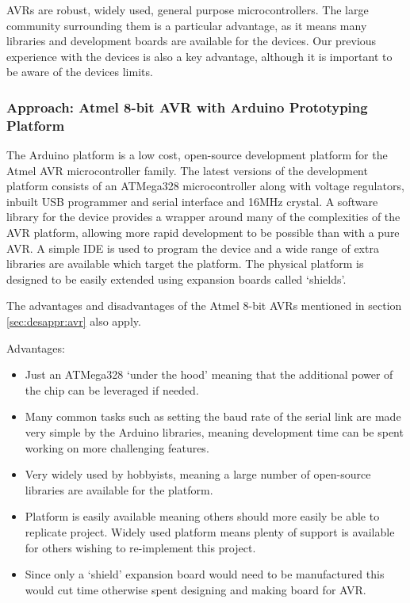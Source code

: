 AVRs are robust, widely used, general purpose microcontrollers. The large community surrounding them is a particular advantage, as it means many libraries and development boards are available for the devices. Our previous experience with the devices is also a key advantage, although it is important to be aware of the devices limits.


\subsubsection{Approach: Atmel 8-bit AVR with Arduino Prototyping Platform}

The Arduino platform is a low cost, open-source development platform for the Atmel AVR microcontroller family. The latest versions of the development platform consists of an ATMega328 microcontroller along with voltage regulators, inbuilt USB programmer and serial interface and 16MHz crystal. A software library for the device provides a wrapper around many of the complexities of the AVR platform, allowing more rapid development to be possible than with a pure AVR. A simple IDE is used to program the device and a wide range of extra libraries are available which target the platform. The physical platform is designed to be easily extended using expansion boards called `shields'.

The advantages and disadvantages of the Atmel 8-bit AVRs mentioned in section \ref{sec:desappr:avr} also apply.

Advantages:
\begin{itemize}
\item Just an ATMega328 `under the hood' meaning that the additional power of the chip can be leveraged if needed.

\item Many common tasks such as setting the baud rate of the serial link are made very simple by the Arduino libraries, meaning development time can be spent working on more challenging features.

\item Very widely used by hobbyists, meaning a large number of open-source libraries are available for the platform.

\item Platform is easily available meaning others should more easily be able to replicate project. Widely used platform means plenty of support is available for others wishing to re-implement this project.

\item Since only a `shield' expansion board would need to be manufactured this would cut time otherwise spent designing and making board for AVR.
\end{itemize}

